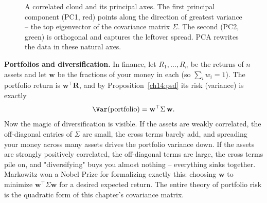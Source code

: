 \begin{figure}[H]
\centering
{}
\caption{A correlated cloud and its principal axes. The first principal component
(PC1, red) points along the direction of greatest variance -- the top eigenvector of
the covariance matrix $\Sigma$. The second (PC2, green) is orthogonal and captures
the leftover spread. PCA rewrites the data in these natural axes.}
\label{ch14:fig-pca}
\end{figure}

\begin{applicationbox}
\textbf{Portfolios and diversification.} In finance, let $R_1, \dots, R_n$ be the
returns of $n$ assets and let $\mathbf{w}$ be the fractions of your money in each
(so $\sum_i w_i = 1$). The portfolio return is $\mathbf{w}^\top \mathbf{R}$, and by
Proposition~\ref{ch14:psd} its risk (variance) is exactly
\[
\Var(\text{portfolio}) = \mathbf{w}^\top \Sigma\, \mathbf{w}.
\]
Now the magic of diversification is visible. If the assets are weakly correlated,
the off-diagonal entries of $\Sigma$ are small, the cross terms barely add, and
spreading your money across many assets drives the portfolio variance down. If the
assets are strongly positively correlated, the off-diagonal terms are large, the
cross terms pile on, and "diversifying" buys you almost nothing -- everything sinks
together. Markowitz won a Nobel Prize for formalizing exactly this: choosing
$\mathbf{w}$ to minimize $\mathbf{w}^\top \Sigma \mathbf{w}$ for a desired expected
return. The entire theory of portfolio risk is the quadratic form of this chapter's
covariance matrix.
\end{applicationbox}

